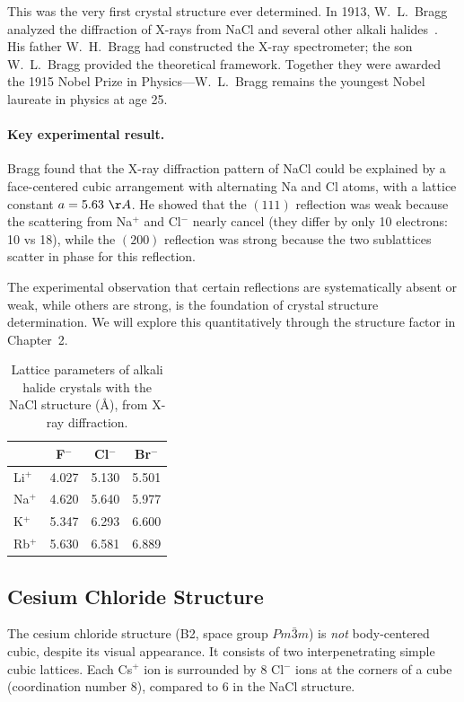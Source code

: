 This was the very first crystal structure ever determined. In 1913, W.~L.~Bragg analyzed the diffraction of X-rays from NaCl and several other alkali halides~\cite{bragg1913structure}. His father W.~H.~Bragg had constructed the X-ray spectrometer; the son W.~L.~Bragg provided the theoretical framework. Together they were awarded the 1915 Nobel Prize in Physics---W.~L.~Bragg remains the youngest Nobel laureate in physics at age 25.

\paragraph{Key experimental result.} Bragg found that the X-ray diffraction pattern of NaCl could be explained by a face-centered cubic arrangement with alternating Na and Cl atoms, with a lattice constant $a = 5.63~\AA{}$. He showed that the $(111)$ reflection was weak because the scattering from Na$^+$ and Cl$^-$ nearly cancel (they differ by only 10 electrons: 10 vs 18), while the $(200)$ reflection was strong because the two sublattices scatter in phase for this reflection.

The experimental observation that certain reflections are systematically absent or weak, while others are strong, is the foundation of crystal structure determination. We will explore this quantitatively through the structure factor in Chapter~2.

\begin{table}[H]
\centering
\caption{Lattice parameters of alkali halide crystals with the NaCl structure (\AA{}), from X-ray diffraction.}
\label{tab:alkali_halides}
\begin{tabular}{@{}lSSS@{}}
\toprule
 & {F$^-$} & {Cl$^-$} & {Br$^-$} \\
\midrule
Li$^+$ & 4.027 & 5.130 & 5.501 \\
Na$^+$ & 4.620 & 5.640 & 5.977 \\
K$^+$  & 5.347 & 6.293 & 6.600 \\
Rb$^+$ & 5.630 & 6.581 & 6.889 \\
\bottomrule
\end{tabular}
\end{table}

\subsection{Cesium Chloride Structure}

The cesium chloride structure (B2, space group $Pm\bar{3}m$) is \textit{not} body-centered cubic, despite its visual appearance. It consists of two interpenetrating simple cubic lattices. Each Cs$^+$ ion is surrounded by 8 Cl$^-$ ions at the corners of a cube (coordination number 8), compared to 6 in the NaCl structure.

